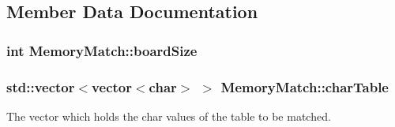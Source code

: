 \subsection{Member Data Documentation}
\hypertarget{classMemoryMatch_aae0a9e51558d70e671fa64aa246de499}{
\subsubsection[{board\-Size}]{\setlength{\rightskip}{0pt plus 5cm}int Memory\-Match\-::board\-Size\hspace{0.3cm}{\ttfamily [private]}}}\label{classMemoryMatch_aae0a9e51558d70e671fa64aa246de499}
\hypertarget{classMemoryMatch_af2437cf6ce06147e64feb7dca23715e7}{
\subsubsection[{char\-Table}]{\setlength{\rightskip}{0pt plus 5cm}std\-::vector$<$vector$<$char$>$ $>$ Memory\-Match\-::char\-Table\hspace{0.3cm}{\ttfamily [private]}}}\label{classMemoryMatch_af2437cf6ce06147e64feb7dca23715e7}


The vector which holds the char values of the table to be matched. 

